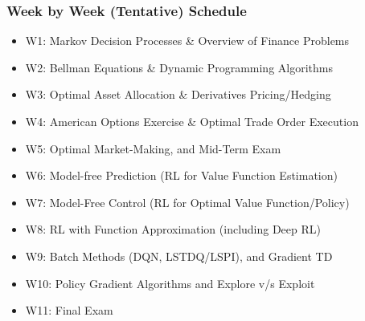 \documentclass[handout]{beamer}
\begin{document}
\begin{frame}
\frametitle{Week by Week (Tentative) Schedule}
\pause
\begin{itemize}[<+->]
\item W1: Markov Decision Processes \& Overview of Finance Problems
\item W2: Bellman Equations \& Dynamic Programming Algorithms
\item W3: Optimal Asset Allocation \& Derivatives Pricing/Hedging
\item W4: American Options Exercise \& Optimal Trade Order Execution
\item W5: Optimal Market-Making, and Mid-Term Exam
\item W6: Model-free Prediction (RL for Value Function Estimation)
\item W7: Model-Free Control (RL for Optimal Value Function/Policy)
\item W8: RL with Function Approximation (including Deep RL)
\item W9: Batch Methods (DQN, LSTDQ/LSPI), and Gradient TD
\item W10: Policy Gradient Algorithms and Explore v/s Exploit
\item W11: Final Exam
\end{itemize}
\end{frame}
\end{document}
